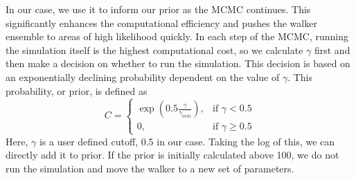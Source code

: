 In our case, we use it to inform our prior as the MCMC continues. This significantly enhances the computational efficiency and pushes the walker ensemble to areas of high likelihood quickly. In each step of the MCMC, running the simulation itself is the highest computational cost, so we calculate $\gamma$ first and then make a decision on whether to run the simulation. This decision is based on an exponentially declining probability dependent on the value of $\gamma$. This probability, or prior, is defined as 
\begin{equation}\label{tidal_prob}
C = 
\begin{cases}
\exp(0.5\frac{\gamma}{\gamma_{min}}), & \text{if } \gamma < 0.5 \\
0, & \text{if } \gamma \geq 0.5
\end{cases}
\end{equation}
Here, $\gamma$ is a user defined cutoff, 0.5 in our case. Taking the log of this, we can directly add it to prior. If the prior is initially calculated above 100, we do not run the simulation and move the walker to a new set of parameters.

